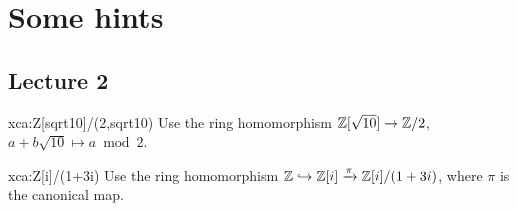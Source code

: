 \chapter*{Some hints}


\section*{Lecture 2}

\begin{sol}{xca:Z[sqrt10]/(2,sqrt10)}
	Use the ring homomorphism $\mathbb{Z}[\sqrt{10}]\to\mathbb{Z}/2$, $a+b\sqrt{10}\mapsto a\bmod 2$. 	
\end{sol}

\begin{sol}{xca:Z[i]/(1+3i)}
	Use the ring homomorphism $\mathbb{Z}\hookrightarrow\mathbb{Z}[i]\xrightarrow{\pi}\mathbb{Z}[i]/(1+3i)$, where
	$\pi$ is the canonical map. 	
\end{sol}

